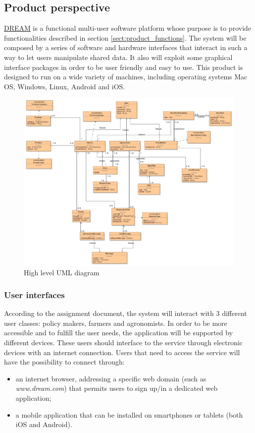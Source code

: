 
\subsection{Product perspective}
\hyperref[tab:acronymsTable]{DREAM} is a functional multi-user software platform whose purpose is to provide functionalities described in section \ref{sect:product_functions}. The system will be composed by a series of software and hardware interfaces that interact in such a way to let users manipulate shared data. It also will exploit some graphical interface packages in order to be user friendly and easy to use.
This product is designed to run on a wide variety of machines, including operating systems Mac OS, Windows, Linux, Android and iOS. 

\begin{figure}[H]
	\centering
    \includegraphics[page=1, width=\textwidth]{Images/uml.JPG}
	\caption{\label{fig:uml_class_diagram}High level UML diagram}
\end{figure}

\subsubsection{User interfaces} %
\label{sect:user_interfaces}
According to the assignment document, the system will interact with 3 different user classes: policy makers, farmers and agronomists. In order to be more accessible and to fulfill the user needs, the application will be supported by different devices. These users should interface to the service through electronic devices with an internet connection. Users that need to access the service will have the possibility to connect through:
\begin{itemize}
    \item an internet browser, addressing a specific web domain (such as \textit{www.dream.com}) that permits users to sign up/in a dedicated web application;
    \item a mobile application that can be installed on smartphones or tablets (both iOS and Android).
\end{itemize}


